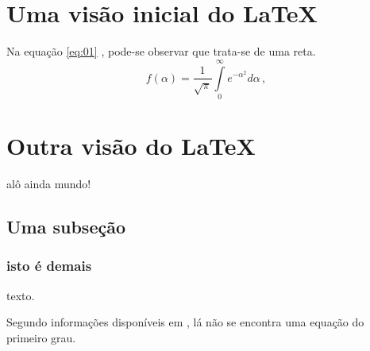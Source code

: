 \documentclass[a4paper,12pt]{article}%
\begin{document}
\section{Uma visão inicial do LaTeX}  \label{sec:01} 
Na equação \ref{eq:01} , pode-se observar que trata-se de uma reta.
\begin{equation}
f(\alpha) = \frac{1}{\sqrt{\pi}} \int \limits_{0}^{\infty} e^{-\alpha^{2}} d \alpha \,,
\label{eq:01}
\end{equation}



\section{Outra visão do LaTeX} \label{sec:02}
alô ainda mundo!
\subsection{Uma subseção}
\subsubsection{isto é demais}
texto.

Segundo informações disponíveis em \cite{fulano2008}, lá não se encontra uma equação do primeiro grau.



\end{document}
